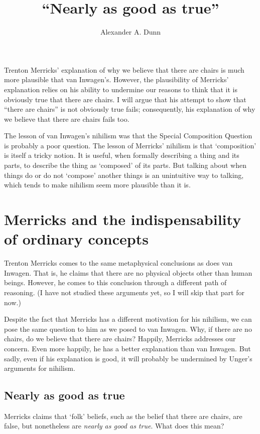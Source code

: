 \documentclass[11pt]{article}
\title{``Nearly as good as true''}
\author{Alexander A. Dunn}
\begin{document}
\ifstandalone
\maketitle
\begin{spacing}{1.25}
\fi

\label{universe}

\noindent Trenton Merricks' explanation of why we believe that there
are chairs is much more plausible that van Inwagen's.  However, the
plausibility of Merricks' explanation relies on his ability to
undermine our reasons to think that it is obviously true that there
are chairs.  I will argue that his attempt to show that ``there are
chairs'' is not obviously true fails; consequently, his explanation of
why we believe that there are chairs fails too.  

The lesson of van Inwagen's nihilism was that the Special Composition
Question is probably a poor question.  The lesson of Merricks'
nihilism is that `composition' is itself a tricky notion.  It is
useful, when formally describing a thing and its parts, to describe
the thing as `composed' of its parts.  But talking about when things
do or do not `compose' another things is an unintuitive way to
talking, which tends to make nihilism seem more plausible than it is.

\section{Merricks and the indispensability of ordinary concepts}
\label{merricks}
Trenton Merricks comes to the same metaphysical conclusions as does
van Inwagen.  That is, he claims that there are no physical objects
other than human beings.  However, he comes to this conclusion through
a different path of reasoning.  (I have not studied these arguments
yet, so I will skip that part for now.)

Despite the fact that Merricks has a different motivation for his
nihilism, we can pose the same question to him as we posed to van
Inwagen.  Why, if there are no chairs, do we believe that there are
chairs?  Happily, Merricks addresses our concern.  Even more happily,
he has a better explanation than van Inwagen.  But sadly, even if his
explanation is good, it will probably be undermined by Unger's
arguments for nihilism.

\subsection{Nearly as good as true}
\label{near}
Merricks claims that `folk' beliefs, such as the belief that there are
chairs, are false, but nonetheless are {\em nearly as good as true}.
What does this mean?


\end{spacing}
\end{document}
